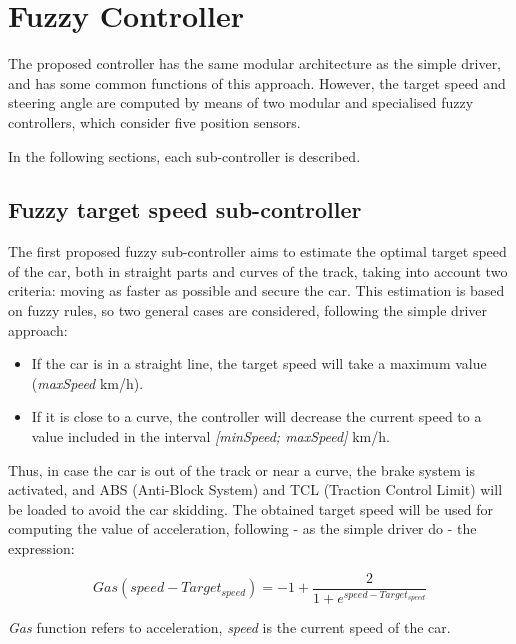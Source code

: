 \documentclass[runningheads,a4paper]{llncs}
\begin{document}
	
	\section{Fuzzy Controller}
	\label{sec:fuzzy_controller}
	
The proposed controller has the same modular architecture as the simple driver, and has some common functions of this approach. 
However, the target speed and steering angle are computed by means of two modular and specialised fuzzy controllers, which consider five position sensors.

In the following sections, each sub-controller is described.


\subsection{Fuzzy target speed sub-controller}

The first proposed fuzzy sub-controller aims to estimate the optimal target speed of the car, both in straight parts and curves of the track, taking into account two criteria: moving as faster as possible and secure the car. This estimation is based on fuzzy rules, so two general cases are considered, following the simple driver approach:

\begin{itemize}
	\item If the car is in a straight line, the target speed will take a maximum value (\textit{maxSpeed} km/h).
	\item If it is close to a curve, the controller will decrease the current speed to a value included in the interval \textit{[minSpeed; maxSpeed]} km/h.
\end{itemize}

Thus, in case the car is out of the track or near a curve, the brake system is activated, and ABS (Anti-Block System) and TCL (Traction Control Limit) will be loaded to avoid the car skidding. The obtained target speed will be used for computing the value of acceleration, following - as the simple driver do - the expression:

\begin{equation}	
Gas(speed-Target_{speed})=-1+\frac{2}{1+e^{speed-Target_{speed}}}	
\end{equation}

\textit{Gas} function refers to acceleration, \textit{speed} is the current speed of the car.
\end{document}
